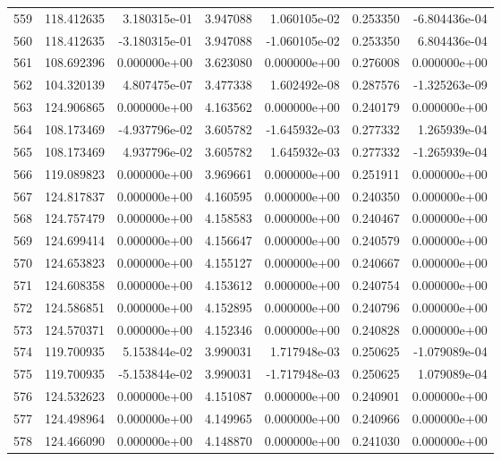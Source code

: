 \begin{tabular}{rrrrrrr}
 559 & 118.412635 &  3.180315e-01 &  3.947088 &  1.060105e-02 &   0.253350 & -6.804436e-04 \\
 560 & 118.412635 & -3.180315e-01 &  3.947088 & -1.060105e-02 &   0.253350 &  6.804436e-04 \\
 561 & 108.692396 &  0.000000e+00 &  3.623080 &  0.000000e+00 &   0.276008 &  0.000000e+00 \\
 562 & 104.320139 &  4.807475e-07 &  3.477338 &  1.602492e-08 &   0.287576 & -1.325263e-09 \\
 563 & 124.906865 &  0.000000e+00 &  4.163562 &  0.000000e+00 &   0.240179 &  0.000000e+00 \\
 564 & 108.173469 & -4.937796e-02 &  3.605782 & -1.645932e-03 &   0.277332 &  1.265939e-04 \\
 565 & 108.173469 &  4.937796e-02 &  3.605782 &  1.645932e-03 &   0.277332 & -1.265939e-04 \\
 566 & 119.089823 &  0.000000e+00 &  3.969661 &  0.000000e+00 &   0.251911 &  0.000000e+00 \\
 567 & 124.817837 &  0.000000e+00 &  4.160595 &  0.000000e+00 &   0.240350 &  0.000000e+00 \\
 568 & 124.757479 &  0.000000e+00 &  4.158583 &  0.000000e+00 &   0.240467 &  0.000000e+00 \\
 569 & 124.699414 &  0.000000e+00 &  4.156647 &  0.000000e+00 &   0.240579 &  0.000000e+00 \\
 570 & 124.653823 &  0.000000e+00 &  4.155127 &  0.000000e+00 &   0.240667 &  0.000000e+00 \\
 571 & 124.608358 &  0.000000e+00 &  4.153612 &  0.000000e+00 &   0.240754 &  0.000000e+00 \\
 572 & 124.586851 &  0.000000e+00 &  4.152895 &  0.000000e+00 &   0.240796 &  0.000000e+00 \\
 573 & 124.570371 &  0.000000e+00 &  4.152346 &  0.000000e+00 &   0.240828 &  0.000000e+00 \\
 574 & 119.700935 &  5.153844e-02 &  3.990031 &  1.717948e-03 &   0.250625 & -1.079089e-04 \\
 575 & 119.700935 & -5.153844e-02 &  3.990031 & -1.717948e-03 &   0.250625 &  1.079089e-04 \\
 576 & 124.532623 &  0.000000e+00 &  4.151087 &  0.000000e+00 &   0.240901 &  0.000000e+00 \\
 577 & 124.498964 &  0.000000e+00 &  4.149965 &  0.000000e+00 &   0.240966 &  0.000000e+00 \\
 578 & 124.466090 &  0.000000e+00 &  4.148870 &  0.000000e+00 &   0.241030 &  0.000000e+00 \\

\end{tabular}
